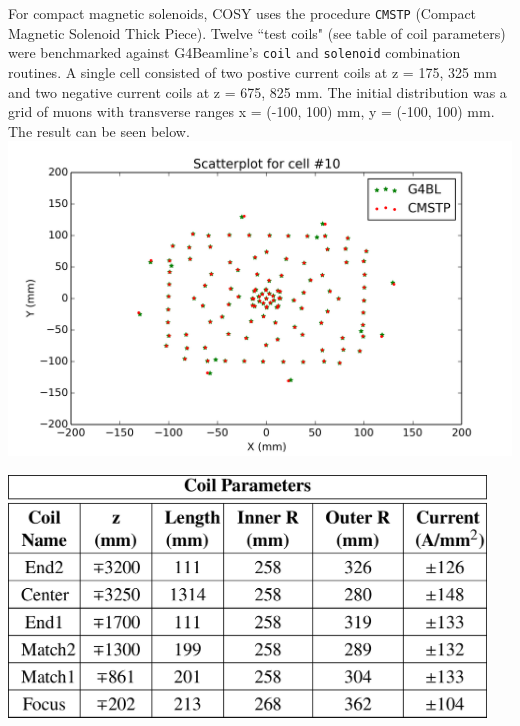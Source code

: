 \documentclass[portrait,a0paper,fontscale=0.285]{baposter} %
\begin{document}
\begin{poster}

{
For compact magnetic solenoids, COSY uses the procedure \texttt{CMSTP} (Compact Magnetic Solenoid Thick Piece). Twelve ``test coils" (see table of coil parameters) were benchmarked against G4Beamline's \texttt{coil} and \texttt{solenoid} combination routines. A single cell consisted of two postive current coils at z = 175, 325 mm and two negative current coils at z = 675, 825 mm. The initial distribution was a grid of muons with transverse ranges x = (-100, 100) mm, y = (-100, 100) mm. The result can be seen below.
\includegraphics[width=\textwidth]{Figures/grid_cell_10.png}

\begin{center} \includegraphics[width=0.95\textwidth]{Figures/coiltable} \end{center}
}



\end{poster}
\end{document}

